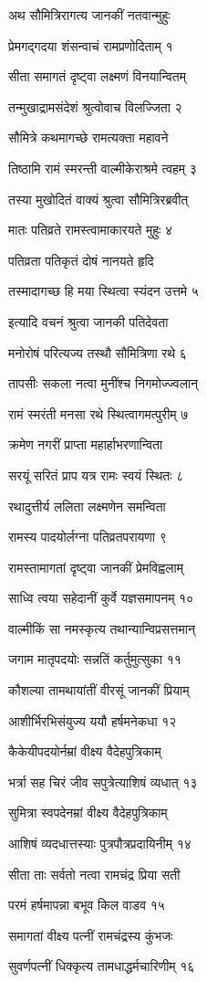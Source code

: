 अथ सौमित्रिरागत्य जानकीं नतवान्मुहुः

प्रेमगद्गदया शंसन्वाचं रामप्रणोदिताम् १

सीता समागतं दृष्ट्वा लक्ष्मणं विनयान्वितम्

तन्मुखाद्रामसंदेशं श्रुत्वोवाच विलज्जिता २

सौमित्रे कथमागच्छे रामत्यक्ता महावने

तिष्ठामि रामं स्मरन्ती वाल्मीकेराश्रमे त्वहम् ३

तस्या मुखोदितं वाक्यं श्रुत्वा सौमित्रिरब्रवीत्

मातः पतिव्रते रामस्त्वामाकारयते मुहुः ४

पतिव्रता पतिकृतं दोषं नानयते हृदि

तस्मादागच्छ हि मया स्थित्वा स्यंदन उत्तमे ५

इत्यादि वचनं श्रुत्वा जानकी पतिदेवता

मनोरोषं परित्यज्य तस्थौ सौमित्रिणा रथे ६

तापसीः सकला नत्वा मुनींश्च निगमोज्ज्वलान्

रामं स्मरंती मनसा रथे स्थित्वागमत्पुरीम् ७

क्रमेण नगरीं प्राप्ता महार्हाभरणान्विता

सरयूं सरितं प्राप यत्र रामः स्वयं स्थितः ८

रथादुत्तीर्य ललिता लक्ष्मणेन समन्विता

रामस्य पादयोर्लग्ना पतिव्रतपरायणा ९

रामस्तामागतां दृष्ट्वा जानकीं प्रेमविह्वलाम्

साध्वि त्वया सहेदानीं कुर्वे यज्ञसमापनम् १०

वाल्मीकिं सा नमस्कृत्य तथान्यान्विप्रसत्तमान्

जगाम मातृपदयोः सन्नतिं कर्तुमुत्सुका ११

कौशल्या तामथायांतीं वीरसूं जानकीं प्रियाम्

आशीर्भिरभिसंयुज्य ययौ हर्षमनेकधा १२

कैकेयीपदयोर्नम्रां वीक्ष्य वैदेहपुत्रिकाम्

भर्त्रा सह चिरं जीव सपुत्रेत्याशिषं व्यधात् १३

सुमित्रा स्वपदेनम्रां वीक्ष्य वैदेहपुत्रिकाम्

आशिषं व्यदधात्तस्याः पुत्रपौत्रप्रदायिनीम् १४

सीता ताः सर्वतो नत्वा रामचंद्र प्रिया सती

परमं हर्षमापन्ना बभूव किल वाडव १५

समागतां वीक्ष्य पत्नीं रामचंद्रस्य कुंभजः

सुवर्णपत्नीं धिक्कृत्य तामधाद्धर्मचारिणीम् १६

